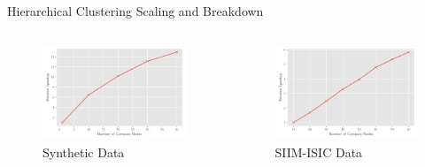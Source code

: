 \documentclass{beamer}
\newcommand{\image}{SIIM-ISIC}
\begin{document}
\begin{frame}{Hierarchical Clustering Scaling and Breakdown}
    \centering
    \begin{columns}
        \begin{column}{0.5\textwidth}
            \begin{figure}
            \includegraphics[width=\figscal]{../plots/synthetic_hierarchical_speedup.pdf}
            \caption{Synthetic  Data}
            \end{figure}
        \end{column}
        \begin{column}{0.5\textwidth}
            \begin{figure}
            \includegraphics[width=\figscal]{../plots/realworld_hierarchical_speedup.pdf}
            \caption{\image{} Data}
            \end{figure}
        \end{column}

\end{columns}
\end{frame}
\end{document}
